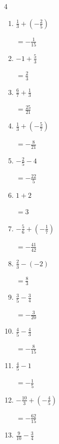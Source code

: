\begin{multicols}{4}
\begin{enumerate}
  \item $\displaystyle \frac{1}{3} + \left(-\frac{2}{5}\right)$

        $\displaystyle =-\frac{1}{15}$

  \item $\displaystyle -1 + \frac{5}{3}$

        $\displaystyle =\frac{2}{3}$

  \item $\displaystyle \frac{6}{7} + \frac{1}{3}$

        $\displaystyle =\frac{25}{21}$

  \item $\displaystyle \frac{1}{3} + \left(-\frac{5}{7}\right)$

        $\displaystyle =-\frac{8}{21}$

  \item $\displaystyle -\frac{2}{5} - 4$

        $\displaystyle =-\frac{22}{5}$

  \item $\displaystyle 1 + 2$

        $\displaystyle =3$

  \item $\displaystyle -\frac{5}{6} + \left(-\frac{1}{7}\right)$

        $\displaystyle =-\frac{41}{42}$

\columnbreak %

  \item $\displaystyle \frac{2}{3} - \left(-2\right)$

        $\displaystyle =\frac{8}{3}$

  \item $\displaystyle \frac{3}{5} - \frac{3}{4}$

        $\displaystyle =-\frac{3}{20}$

  \item $\displaystyle \frac{4}{5} - \frac{4}{3}$

        $\displaystyle =-\frac{8}{15}$

  \item $\displaystyle \frac{4}{5} - 1$

        $\displaystyle =-\frac{1}{5}$

  \item $\displaystyle -\frac{10}{3} + \left(-\frac{4}{5}\right)$

        $\displaystyle =-\frac{62}{15}$

  \item $\displaystyle \frac{9}{10} - \frac{3}{4}$


\end{enumerate}
\end{multicols}
